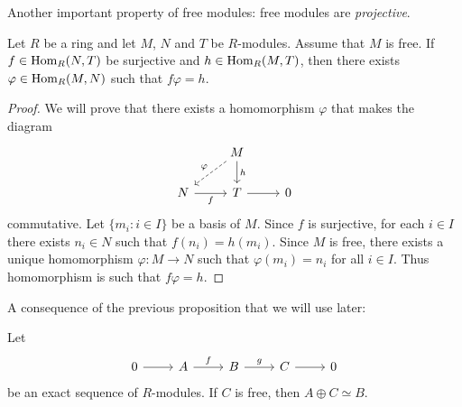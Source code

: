 Another important property of free modules: free modules are
\emph{projective}. 

\begin{proposition}
	\label{pro:free=>projective}
    Let $R$ be a ring and 
    let $M$, $N$ and $T$ be $R$-modules. Assume that $M$ is free. 
	If $f\in\operatorname{Hom}_R(N,T)$ be surjective and
	$h\in\operatorname{Hom}_R(M,T)$, then there exists $\varphi\in\operatorname{Hom}_R(M,N)$ such that
	$f\varphi=h$. 
\end{proposition}

\begin{proof}
    We will prove that 
    there exists a homomorphism $\varphi$ that makes
    the diagram
    \[\begin{tikzcd}
	& M \\
	N & T & 0
	\arrow["f"', from=2-1, to=2-2]
	\arrow[from=2-2, to=2-3]
	\arrow["h", from=1-2, to=2-2]
	\arrow["\varphi"', dashed, from=1-2, to=2-1]
\end{tikzcd}\]
    commutative. 
	Let $\{m_i:i\in I\}$ be a basis of $M$. Since $f$ is surjective, for each
	$i\in I$ there exists $n_i\in N$ such that $f(n_i)=h(m_i)$. Since  $M$ is
	free, there exists a unique homomorphism $\varphi\colon M\to N$ such that
	$\varphi(m_i)=n_i$ for all $i\in I$. Thus homomorphism is such that
	$f\varphi=h$. 
\end{proof}

A consequence of the previous proposition
that we will use later:

\begin{proposition}
\label{pro:split}
	Let 
	\[
	   \begin{tikzcd}
        0 & A & B & C & 0
        \arrow[from=1-1, to=1-2]
        \arrow["f", from=1-2, to=1-3]
        \arrow["g", from=1-3, to=1-4]
        \arrow[from=1-4, to=1-5]
    \end{tikzcd}
	\]
	be an exact sequence of $R$-modules.  If $C$ is free, then $A\oplus C\simeq B$. 
\end{proposition}

